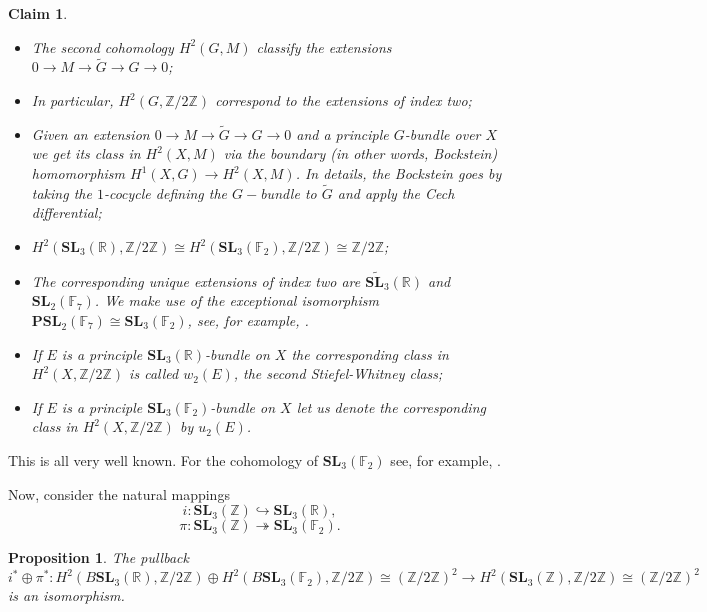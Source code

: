 \documentclass[a4paper]{article}
\newtheorem{Prop}[Thm]{Proposition}
\newtheorem{Cla}[Thm]{Claim}
\newcommand{\embeds}{\hookrightarrow}
\newcommand{\projects}{\twoheadrightarrow}
\newcommand{\SL}{\mathbf{SL}_3(\mathbb{Z})}        %
\begin{document}
\begin{Cla}
\begin{itemize}
	\item The second cohomology $H^2(G, M)$ classify the extensions $0 \to M \to \tilde G \to G \to 0$;
	\item In particular, $H^2(G, \mathbb{Z}/2\mathbb{Z})$ correspond to the extensions of index two;
\item Given an extension $0 \to M \to \tilde G \to G \to 0$ and a principle $G$-bundle over $X$ we get its class in $H^2(X, M)$ via the boundary (in other words, Bockstein) homomorphism $H^1(X, G) \to H^2(X, M)$.  In details, the Bockstein goes by taking the $1$-cocycle defining the $G-$bundle to $\tilde G$ and apply the Cech differential;
	\item $H^2( \mathbf{SL}_3(\mathbb{R}), \mathbb{Z}/ 2 \mathbb{Z}) \cong
	H^2( \mathbf{SL}_3(\mathbb{F}_2), \mathbb{Z}/ 2 \mathbb{Z}) \cong \mathbb{Z}/2\mathbb{Z}$;
\item The corresponding unique extensions of index two are $\widetilde{\mathbf{SL}_3}(\mathbb{R})$ and $\mathbf{SL}_2(\mathbb{F}_7)$.
	We make use of the exceptional isomorphism $\mathbf{PSL}_2(\mathbb{F}_7) \cong \mathbf{SL}_3(\mathbb{F}_2)$, see, for example, \cite{merzon_psl_2_7_sl_3_2}.
\item If $E$ is a principle $\mathbf{SL}_3(\mathbb{R})$-bundle on $X$ the corresponding class in $H^2(X, \mathbb{Z}/ 2 \mathbb{Z})$ is called $w_2(E)$, the second Stiefel-Whitney class;
\item If $E$ is a principle $\mathbf{SL}_3(\mathbb{F}_2)$-bundle on $X$ let us denote the corresponding class in $H^2(X, \mathbb{Z}/ 2 \mathbb{Z})$ by $u_2(E)$.
\end{itemize}
\end{Cla}
This is all very well known.
For the cohomology of $\mathbf{SL}_3(\mathbb{F}_2)$ see, for example, \cite{adem2006lecturescohomologyfinitegroups}.

Now, consider the natural mappings
\[
i: \SL \embeds {\mathbf{SL}_3(\mathbb{R})}
, \] 
\[
\pi: \SL \projects {\mathbf{SL}_3(\mathbb{F}_2)}
.\] 

\begin{Prop}
The pullback 
\[
i^* \oplus \pi^*: 
H^2(B\mathbf{SL}_3(\mathbb{R}), \mathbb{Z}/ 2 \mathbb{Z}) \oplus
H^2(B\mathbf{SL}_3(\mathbb{F}_2), \mathbb{Z}/ 2 \mathbb{Z}) \cong (\mathbb{Z} / 2 \mathbb{Z})^2 \to 
H^2(\SL, \mathbb{Z}/ 2 \mathbb{Z}) \cong (\mathbb{Z}/2\mathbb{Z})^{2}
\] 
is an isomorphism.
\end{Prop}
\end{document}
